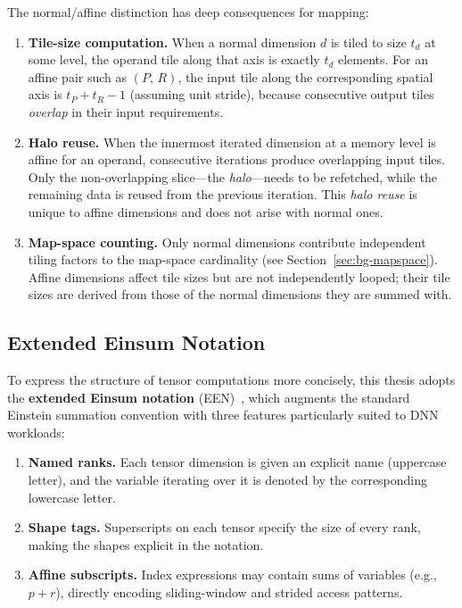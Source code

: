 The normal/affine distinction has deep consequences for mapping:
\begin{enumerate}
  \item \textbf{Tile-size computation.}
    When a normal dimension $d$ is tiled to size $t_d$ at some level, the
    operand tile along that axis is exactly $t_d$ elements.
    For an affine pair such as $(P,\,R)$, the input tile along the
    corresponding spatial axis is $t_P + t_R - 1$ (assuming unit stride),
    because consecutive output tiles \emph{overlap} in their input
    requirements.
  \item \textbf{Halo reuse.}
    When the innermost iterated dimension at a memory level is affine for
    an operand, consecutive iterations produce overlapping input tiles.
    Only the non-overlapping slice---the \emph{halo}---needs to be
    refetched, while the remaining data is reused from the previous
    iteration.
    This \emph{halo reuse} is unique to affine dimensions and does not
    arise with normal ones.
  \item \textbf{Map-space counting.}
    Only normal dimensions contribute independent tiling factors to the
    map-space cardinality (see Section~\ref{sec:bg-mapspace}).
    Affine dimensions affect tile sizes but are not independently looped;
    their tile sizes are derived from those of the normal dimensions
    they are summed with.
\end{enumerate}


\subsection{Extended Einsum Notation}
\label{sec:een}

To express the structure of tensor computations more concisely,
this thesis adopts the \textbf{extended Einsum notation}
(EEN)~\cite{abdelfattah2016EEN}, which augments the standard Einstein
summation convention with three features particularly suited to DNN
workloads:
\begin{enumerate}
  \item \textbf{Named ranks.}
    Each tensor dimension is given an explicit name (uppercase letter),
    and the variable iterating over it is denoted by the corresponding
    lowercase letter.
  \item \textbf{Shape tags.}
    Superscripts on each tensor specify the size of every rank, making
    the shapes explicit in the notation.
  \item \textbf{Affine subscripts.}
    Index expressions may contain sums of variables (e.g., $p + r$),
    directly encoding sliding-window and strided access patterns.
\end{enumerate}

